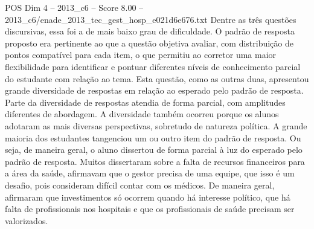 \begin{textsample}{POS Dim 4 – 2013\_c6 – Score 8.00 – 2013\_c6/enade\_2013\_tec\_gest\_hosp\_e021d6e676.txt}
Dentre as três questões discursivas, essa foi a de mais baixo grau de dificuldade.
O padrão de resposta proposto era pertinente ao que a questão objetiva avaliar, com distribuição de pontos compatível para cada item, o que permitiu ao corretor uma maior flexibilidade para identificar e pontuar diferentes níveis de conhecimento parcial do estudante com relação ao tema.
Esta questão, como as outras duas, apresentou grande diversidade de respostas em relação ao esperado pelo padrão de resposta.
Parte da diversidade de respostas atendia de forma parcial, com amplitudes diferentes de abordagem.
A diversidade também ocorreu porque os alunos adotaram as mais diversas perspectivas, sobretudo de natureza política.
A grande maioria dos estudantes tangenciou um ou outro item do padrão de resposta.
Ou seja, de maneira geral, o aluno dissertou de forma parcial à luz do esperado pelo padrão de resposta.
Muitos dissertaram sobre a falta de recursos financeiros para a área da saúde, afirmavam que o gestor precisa de uma equipe, que isso é um desafio, pois consideram difícil contar com os médicos.
De maneira geral, afirmaram que investimentos só ocorrem quando há interesse político, que há falta de profissionais nos hospitais e que os profissionais de saúde precisam ser valorizados.

\end{textsample}
